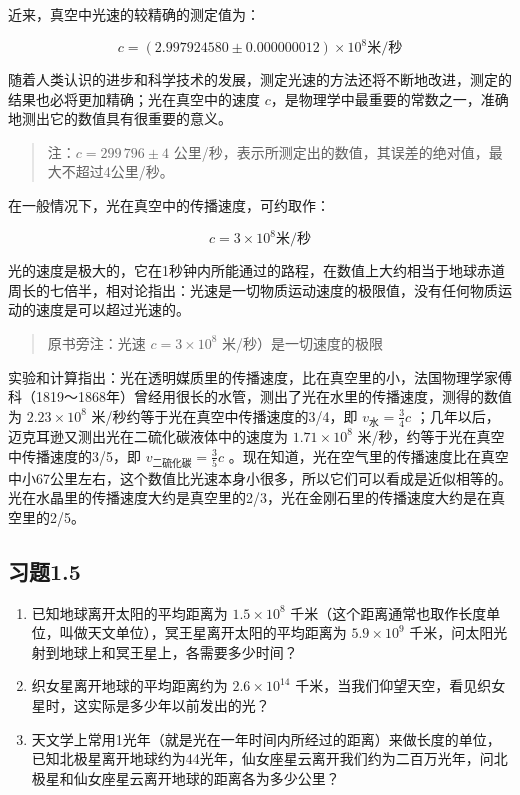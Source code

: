 近来，真空中光速的较精确的测定值为：

\[
c = (2.997924580 \pm 0.000000012) \times 10 ^ {8} \text{米/秒}
\]

随着人类认识的进步和科学技术的发展，测定光速的方法还将不断地改进，测定的结果也必将更加精确；光在真空中的速度
\(c\)，是物理学中最重要的常数之一，准确地测出它的数值具有很重要的意义。

\begin{quote}
注：\(c=299\,796\pm4\)
公里/秒，表示所测定出的数值，其误差的绝对值，最大不超过4公里/秒。
\end{quote}

在一般情况下，光在真空中的传播速度，可约取作：

\[
c = 3 \times 10 ^ {8} \text{米/秒}
\]

光的速度是极大的，它在1秒钟内所能通过的路程，在数值上大约相当于地球赤道周长的七倍半，相对论指出：光速是一切物质运动速度的极限值，没有任何物质运动的速度是可以超过光速的。

\begin{quote}
原书旁注：光速 \(c=3\times10^{8}\) 米/秒）是一切速度的极限
\end{quote}

实验和计算指出：光在透明媒质里的传播速度，比在真空里的小，法国物理学家傅科（1819～1868年）曾经用很长的水管，测出了光在水里的传播速度，测得的数值为
\(2.23\times10^{8}\) 米/秒约等于光在真空中传播速度的3/4，即
\(v_{\text{水}}=\frac{3}{4}c\)
；几年以后，迈克耳逊又测出光在二硫化碳液体中的速度为
\(1.71\times10^{8}\) 米/秒，约等于光在真空中传播速度的3/5，即
\(v_{\text{二硫化碳}}=\frac{3}{5}c\)
。现在知道，光在空气里的传播速度比在真空中小67公里左右，这个数值比光速本身小很多，所以它们可以看成是近似相等的。光在水晶里的传播速度大约是真空里的2/3，光在金刚石里的传播速度大约是在真空里的2/5。

\subsection{习题1.5}

\begin{enumerate}
\item
  已知地球离开太阳的平均距离为 \(1.5 \times 10^{8}\)
  千米（这个距离通常也取作长度单位，叫做天文单位），冥王星离开太阳的平均距离为
  \(5.9 \times 10^{9}\)
  千米，问太阳光射到地球上和冥王星上，各需要多少时间？
\item
  织女星离开地球的平均距离约为 \(2.6 \times 10^{14}\)
  千米，当我们仰望天空，看见织女星时，这实际是多少年以前发出的光？
\item
  天文学上常用1光年（就是光在一年时间内所经过的距离）来做长度的单位，已知北极星离开地球约为44光年，仙女座星云离开我们约为二百万光年，问北极星和仙女座星云离开地球的距离各为多少公里？
\end{enumerate}

